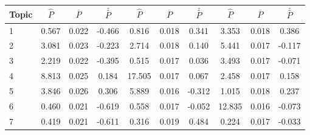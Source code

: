 \begin{singlespacing}
\begin{center}
\begin{threeparttable}
\begin{small}
\begin{tabular}{|l|c|c|c|c|c|c|c|c|c|}
        Topic                   & \textbf{$\hat{P}$} & \textbf{$\overline{P}$} & \textbf{$\stackrel{z}{P}$}& \textbf{$\hat{P}$} & \textbf{$\overline{P}$} & \textbf{$\stackrel{z}{P}$}& \textbf{$\hat{P}$} & \textbf{$\overline{P}$} & \textbf{$\stackrel{z}{P}$}\\
        \hline
        1 & 0.567   & 0.022 & -0.466    & 0.816     & 0.018 & 0.341   & 3.353     & 0.018 & 0.386   \\
        \hline
        2 & 3.081 & 0.023   & -0.223    & 2.714     & 0.018 & 0.140   & 5.441     & 0.017 & -0.117  \\
        \hline
        3 & 2.219 & 0.022   & -0.395    & 0.515     & 0.017 & 0.036   & 3.493     & 0.017 & -0.071  \\
        \hline
        4 & 8.813 & 0.025   & 0.184     & 17.505    & 0.017 & 0.067   & 2.458     & 0.017 & 0.158   \\
        \hline
        5 & 3.846 & 0.026 & 0.306     & 5.889     & 0.016 & -0.312    & 1.015     & 0.018 & 0.237   \\
        \hline
        6 & 0.460 & 0.021 & -0.619    & 0.558     & 0.017 & -0.052    & 12.835    & 0.016 & -0.073  \\
        \hline
        7 & 0.419 & 0.021 & -0.611    & 0.316     & 0.019 & 0.484     & 0.224     & 0.017 & -0.033  \\
        \hline
        \end{tabular}
    \end{small}
    \end{threeparttable}
\end{center}
\end{singlespacing}